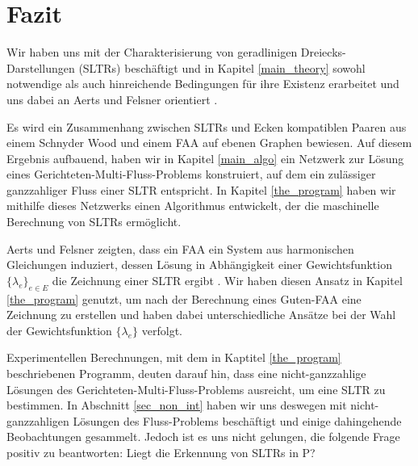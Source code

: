 \chapter{Fazit}

Wir haben uns mit der Charakterisierung von geradlinigen Dreiecks-Darstellungen (SLTRs) beschäftigt und in Kapitel \ref{main_theory} sowohl notwendige als auch hinreichende Bedingungen für ihre Existenz erarbeitet und uns dabei an Aerts und Felsner orientiert \cite{af15}.

Es wird ein Zusammenhang zwischen SLTRs und Ecken kompatiblen Paaren aus einem Schnyder Wood und einem FAA auf ebenen Graphen bewiesen. Auf diesem Ergebnis aufbauend, haben wir in Kapitel \ref{main_algo} ein Netzwerk zur Lösung eines Gerichteten-Multi-Fluss-Problems konstruiert, auf dem ein zulässiger ganzzahliger Fluss einer SLTR entspricht. In Kapitel \ref{the_program} haben wir mithilfe dieses Netzwerks einen Algorithmus entwickelt, der die maschinelle Berechnung von SLTRs ermöglicht.

Aerts und Felsner zeigten, dass ein FAA ein System aus harmonischen Gleichungen induziert, dessen Lösung in Abhängigkeit einer Gewichtsfunktion $\{\lambda_e\}_{e\in E}$ die Zeichnung einer SLTR ergibt \cite{af13}. Wir haben diesen Ansatz in Kapitel \ref{the_program} genutzt, um nach der Berechnung eines Guten-FAA eine Zeichnung zu erstellen und haben dabei unterschiedliche Ansätze bei der Wahl der Gewichtsfunktion $\{\lambda_e\}$ verfolgt.

Experimentellen Berechnungen, mit dem in Kaptitel \ref{the_program} beschriebenen Programm, deuten darauf hin, dass eine nicht-ganzzahlige Lösungen des Gerichteten-Multi-Fluss-Problems ausreicht, um eine SLTR zu bestimmen. In Abschnitt \ref{sec_non_int} haben wir uns deswegen mit nicht-ganzzahligen Lösungen des Fluss-Problems beschäftigt und einige dahingehende Beobachtungen gesammelt. Jedoch ist es uns nicht gelungen, die folgende Frage positiv zu beantworten: Liegt die Erkennung von SLTRs in P?